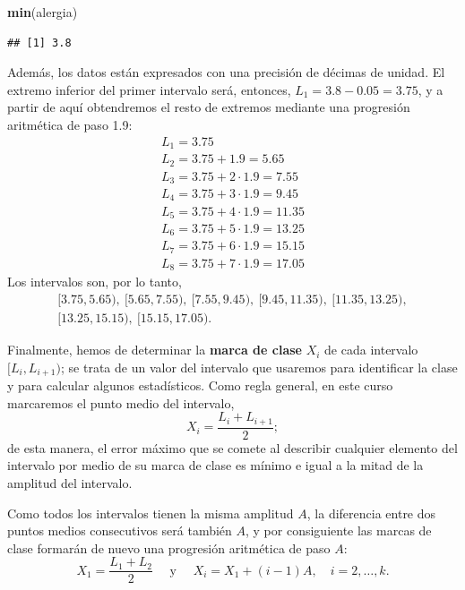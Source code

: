 \documentclass[]{book}
\newenvironment{Shaded}{\begin{snugshade}}{\end{snugshade}}
\newcommand{\KeywordTok}[1]{\textcolor[rgb]{0.13,0.29,0.53}{\textbf{#1}}}
\newcommand{\NormalTok}[1]{#1}
\theoremstyle{definition}
\theoremstyle{definition}
\theoremstyle{definition}
\theoremstyle{remark}
\begin{document}
\begin{Shaded}
\begin{Highlighting}[]
\KeywordTok{min}\NormalTok{(alergia)}
\end{Highlighting}
\end{Shaded}

\begin{verbatim}
## [1] 3.8
\end{verbatim}

Además, los datos están expresados con una precisión de décimas de unidad. El extremo inferior del primer intervalo será, entonces, \(L_1=3.8-0.05=3.75\), y a partir de aquí obtendremos el resto de extremos mediante una progresión aritmética de paso 1.9:
\[
\begin{array}{l}
L_1=3.75\\
L_2=3.75+1.9=5.65\\ 
L_3=3.75+2\cdot 1.9 = 7.55\\ 
L_4= 3.75+3\cdot 1.9 = 9.45\\ 
L_5= 3.75+4\cdot 1.9 = 11.35\\ 
L_6= 3.75+5\cdot 1.9 = 13.25\\
L_7= 3.75+6\cdot 1.9 = 15.15\\
 L_8= 3.75+7\cdot 1.9 = 17.05
\end{array}
\]
Los intervalos son, por lo tanto,
\[
\begin{array}{l}
[3.75,5.65),\ [5.65,7.55),\ [7.55,9.45),\ [9.45, 11.35),\ [11.35 ,13.25),\\{}
[13.25,15.15),\ [15.15,17.05).
\end{array}
\]

Finalmente, hemos de determinar la \textbf{marca de clase} \(X_i\) de cada intervalo \([L_i,L_{i+1})\); se trata de un valor del intervalo que usaremos para identificar la clase y para calcular algunos estadísticos. Como regla general, en este curso marcaremos el punto medio del intervalo,
\[
X_i=\frac{L_{i}+L_{i+1}}{2};
\]
de esta manera, el error máximo que se comete al describir cualquier elemento del intervalo por medio de su marca de clase es mínimo e igual a la mitad de la amplitud del intervalo.

Como todos los intervalos tienen la misma amplitud \(A\), la diferencia entre dos puntos medios consecutivos será también \(A\), y por consiguiente las marcas de clase formarán de nuevo una progresión aritmética de paso \(A\):
\[
X_1=\frac{L_1+L_2}{2}\quad \text{ y }\quad X_i=X_1+(i-1)A, \quad i=2,\ldots,k.
\]
\end{document}
